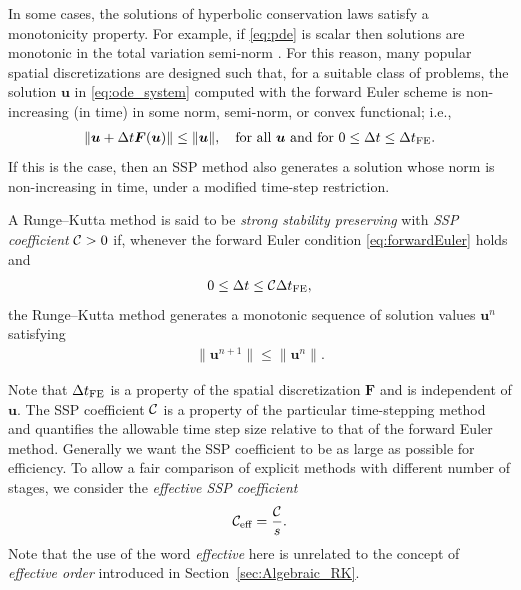 \documentclass[final]{siamltex}  %
\begin{document}
In some cases, the solutions of hyperbolic conservation laws satisfy a 
monotonicity property. For example, if \eqref{eq:pde} is scalar then solutions 
are monotonic in the total variation semi-norm \cite{Ketcheson2008}.
For this reason, many popular spatial discretizations are designed such 
that, for a suitable class of problems, the solution $\bm{u}$ in 
\eqref{eq:ode_system} computed with the forward Euler scheme is
non-increasing (in time) in some norm, semi-norm, or convex functional; i.e.,
\begin{align}\label{eq:forwardEuler}
    \|\bm{u} + \Delta t\bm{F}(\bm{u})\| \le \|\bm{u}\|, \quad \text{for all } \bm{u} \text{ and for } 0 \le \Delta t \le \Delta t_{\textnormal{FE}}.
\end{align}
If this is the case, then an SSP method also generates a solution whose norm is
non-increasing in time, under a modified time-step restriction.
\begin{definition}
	A Runge--Kutta method is said to be \emph{strong stability preserving} with
	\emph{SSP coefficient} $\mathcal{C} > 0$ if, whenever the forward Euler condition
	\eqref{eq:forwardEuler} holds and 
	\begin{align*}
		0 \leq \Delta t \leq \mathcal{C} \Delta t_{\textnormal{FE}},
	\end{align*}
	the Runge--Kutta method generates a monotonic sequence of solution values $\bm{u}^n$ satisfying
	\begin{align*}
  		\|\bm{u}^{n+1}\| \le \|\bm{u}^n\|.
	\end{align*}
\end{definition}

Note that $\Delta t_{\textnormal{FE}}$ is a property of the spatial discretization $\bm{F}$
and is independent of $\bm{u}$.
The SSP coefficient $\mathcal{C}$ is a property of the particular
time-stepping method and quantifies the allowable time step size relative 
to that of the forward Euler method.
Generally we want the SSP coefficient to be as large as possible for efficiency.
To allow a fair comparison of explicit methods with different number of stages, 
we consider the \emph{effective SSP coefficient}
\begin{align*}
	\mathcal{C}_{\textnormal{eff}} = \frac{\mathcal{C}}{s}.
\end{align*}
Note that the use of the word \emph{effective} here is unrelated to the 
concept of \emph{effective order} introduced in Section~\ref{sec:Algebraic_RK}.
\end{document}
